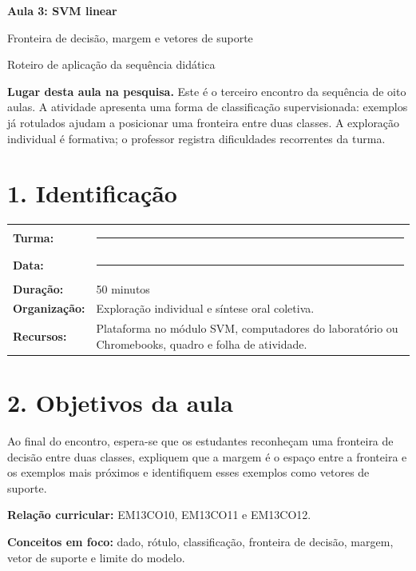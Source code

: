 \documentclass[12pt,a4paper]{article}
\newcommand{\bloco}[1]{%
  \vspace{0.25em}
  \noindent\colorbox{cinza}{\parbox{0.96\linewidth}{#1}}%
  \vspace{0.3em}
}
\begin{document}
\begin{center}
  {\LARGE\bfseries\color{azul} Aula 3: SVM linear}\par
  \vspace{0.25em}
  {\large Fronteira de decisão, margem e vetores de suporte}\par
  \vspace{0.35em}
  {\small Roteiro de aplicação da sequência didática}\par
\end{center}

\bloco{\textbf{Lugar desta aula na pesquisa.} Este é o terceiro encontro da sequência de oito aulas. A atividade apresenta uma forma de classificação supervisionada: exemplos já rotulados ajudam a posicionar uma fronteira entre duas classes. A exploração individual é formativa; o professor registra dificuldades recorrentes da turma.}

\section*{1. Identificação}

\begin{tabularx}{\linewidth}{@{}>{\bfseries}p{4.1cm}X@{}}
Turma: & \rule{8.5cm}{0.35pt} \\
Data: & \rule{8.5cm}{0.35pt} \\
Duração: & 50 minutos \\
Organização: & Exploração individual e síntese oral coletiva. \\
Recursos: & Plataforma no módulo SVM, computadores do laboratório ou Chromebooks, quadro e folha de atividade. \\
\end{tabularx}

\section*{2. Objetivos da aula}

Ao final do encontro, espera-se que os estudantes reconheçam uma fronteira de decisão entre duas classes, expliquem que a margem é o espaço entre a fronteira e os exemplos mais próximos e identifiquem esses exemplos como vetores de suporte.

\textbf{Relação curricular:} EM13CO10, EM13CO11 e EM13CO12.

\textbf{Conceitos em foco:} dado, rótulo, classificação, fronteira de decisão, margem, vetor de suporte e limite do modelo.
\end{document}

